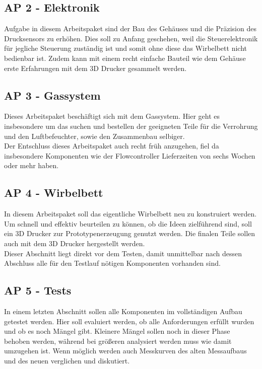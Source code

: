 \subsection{AP 2 - Elektronik}

Aufgabe in diesem Arbeitspaket sind der Bau des Gehäuses und die Präzision des Drucksensors zu erhöhen. Dies soll zu Anfang geschehen, weil die Steuerelektronik für jegliche Steuerung zuständig ist und somit ohne diese das Wirbelbett nicht bedienbar ist. Zudem kann mit einem recht einfache Bauteil wie dem Gehäuse erste Erfahrungen mit dem 3D Drucker gesammelt werden.

\subsection{AP 3 - Gassystem}

Dieses Arbeitspaket beschäftigt sich mit dem Gassystem. Hier geht es insbesondere um das suchen und bestellen der geeigneten Teile für die Verrohrung und den Luftbefeuchter, sowie den Zusammenbau selbiger. \\
Der Entschluss dieses Arbeitspaket auch recht früh anzugehen, fiel da insbesondere Komponenten wie der Flowcontroller Lieferzeiten von sechs Wochen oder mehr haben. 

\subsection{AP 4 - Wirbelbett}

In diesem Arbeitspaket soll das eigentliche Wirbelbett neu zu konstruiert werden. Um schnell und effektiv beurteilen zu können, ob die Ideen zielführend sind, soll ein 3D Drucker zur Prototypenerzeugung genutzt werden. Die finalen Teile sollen auch mit dem 3D Drucker hergestellt werden. \\
Dieser Abschnitt liegt direkt vor dem Testen, damit unmittelbar nach dessen Abschluss alle für den Testlauf nötigen Komponenten vorhanden sind.


\subsection{AP 5 - Tests}

In einem letzten Abschnitt sollen alle Komponenten im vollständigen Aufbau getestet werden. Hier soll evaluiert werden, ob alle Anforderungen erfüllt wurden und ob es noch Mängel gibt. Kleinere Mängel sollen noch in dieser Phase behoben werden, während bei größeren analysiert werden muss wie damit umzugehen ist. Wenn möglich werden auch Messkurven des alten Messaufbaus und des neuen verglichen und diskutiert.


